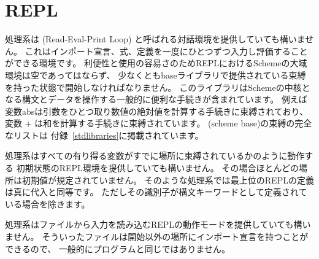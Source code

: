 \section{REPL}

処理系は  (Read-Eval-Print Loop) と呼ばれる対話環境を提供していても構いません。
これはインポート宣言、式、定義を一度にひとつずつ入力し評価することができる環境です。
利便性と使用の容易さのためREPLにおけるSchemeの大域環境は空であってはならず、
少なくともbaseライブラリで提供されている束縛を持った状態で開始しなければなりません。
このライブラリはSchemeの中核となる構文とデータを操作する一般的に便利な手続きが含まれています。
例えば変数{\cf abs}は引数をひとつ取り数値の絶対値を計算する手続きに束縛されており、
変数 {\cf +} は和を計算する手続きに束縛されています。
(scheme base)の束縛の完全なリストは
付録~\ref{stdlibraries}に掲載されています。

処理系はすべての有り得る変数がすでに場所に束縛されているかのように動作する
初期状態のREPL環境を提供していても構いません。
その場合ほとんどの場所は初期値が規定されていません。
そのような処理系では最上位のREPLの定義は真に代入と同等です。
ただしその識別子が構文キーワードとして定義されている場合を除きます。

処理系はファイルから入力を読み込むREPLの動作モードを提供していても構いません。
そういったファイルは開始以外の場所にインポート宣言を持つことができるので、
一般的にプログラムと同じではありません。
